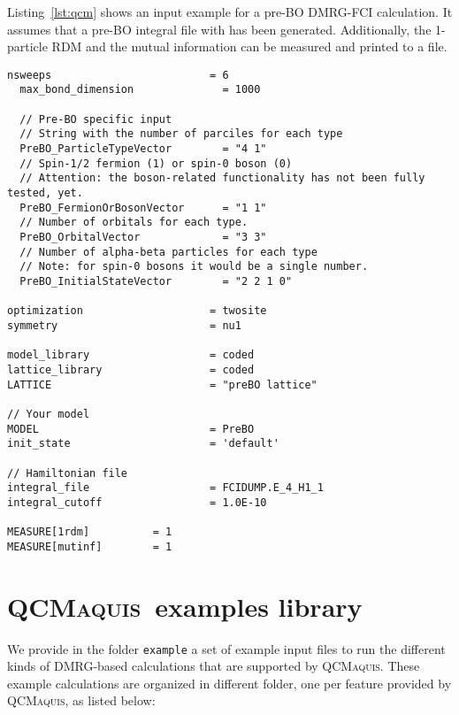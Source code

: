 \documentclass[bibliography=totoc,12pt,a4paper]{scrartcl}
\newcommand{\qcm}{\textsc{QCMaquis}}
\begin{document}
Listing~\ref{lst:qcm} shows an input example for a pre-BO DMRG-FCI calculation. 
It assumes that a pre-BO integral file with has been generated. Additionally,
the 1-particle RDM and the mutual information can be measured and printed to a
file.

\begin{lstlisting}[language=qcmaquis,
				   caption={Input example for a pre-BO DMRG-FCI calculation},
				   label=lst:preboinput]
  nsweeps                         = 6
  max_bond_dimension              = 1000

  // Pre-BO specific input
  // String with the number of parciles for each type
  PreBO_ParticleTypeVector        = "4 1"
  // Spin-1/2 fermion (1) or spin-0 boson (0)
  // Attention: the boson-related functionality has not been fully tested, yet.
  PreBO_FermionOrBosonVector      = "1 1"
  // Number of orbitals for each type.
  PreBO_OrbitalVector             = "3 3"
  // Number of alpha-beta particles for each type
  // Note: for spin-0 bosons it would be a single number.
  PreBO_InitialStateVector        = "2 2 1 0"

optimization                    = twosite 
symmetry                        = nu1

model_library                   = coded
lattice_library                 = coded
LATTICE                         = "preBO lattice" 

// Your model
MODEL                           = PreBO
init_state                      = 'default'

// Hamiltonian file
integral_file                   = FCIDUMP.E_4_H1_1
integral_cutoff                 = 1.0E-10

MEASURE[1rdm]          = 1
MEASURE[mutinf]        = 1
\end{lstlisting}


\section{\qcm\ examples library}
\label{sec:examples}

We provide in the folder \texttt{example} a set of example input files to run the different kinds of DMRG-based calculations that are supported by \qcm{}.
These example calculations are organized in different folder, one per feature provided by \qcm, as listed below:
\end{document}
